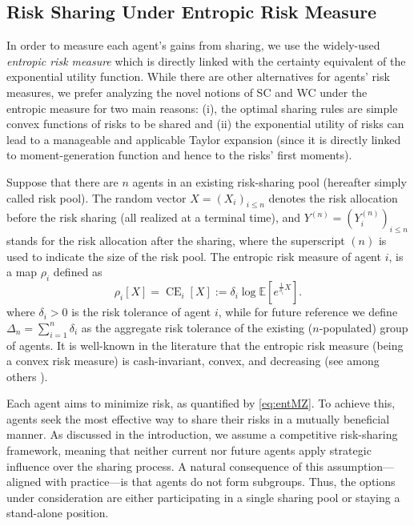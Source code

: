 \documentclass[fleqn,mnsc,nonblindrev]{informs4}
\newcommand{\CE}{\operatorname{CE}}
\begin{document}
\subsection{Risk Sharing Under Entropic Risk Measure } \label{sec:classic}

In order to measure each agent's gains from sharing, we use the widely-used \textit{entropic risk measure} which is directly linked with the certainty equivalent of the exponential utility function. While there are other alternatives for agents' risk measures, we prefer analyzing the  {novel} notions of SC and WC under the entropic measure for two main reasons: (i), the optimal sharing rules are simple convex functions of risks to be shared and (ii) the exponential utility of risks can lead to a manageable and applicable Taylor expansion (since it is directly linked to moment-generation function and hence to the risks' first moments). 

Suppose that there are $n$ agents in an existing risk-sharing pool (hereafter simply called risk pool). The random vector $X=(X_i)_{i\leq n}$ denotes the risk allocation before the risk sharing  {(all realized at a terminal time)}, and $Y^{(n)}=(Y_i^{(n)})_{i\leq n}$ stands for the risk allocation after the sharing, where the superscript $(n)$ is used to indicate the size of the risk pool. The entropic risk measure of agent $i$, is a map  $\rho_i$ defined as 
\begin{equation}\label{eq:entMZ}
\rho_i[X]=\CE_i[X]:=\delta_i\log\mathbb{E}[e^{\frac{1}{\delta_i}X}].
\end{equation}
where $\delta_i>0$ is the risk tolerance of agent $i$, while for future reference we define $\Delta_n=\sum_{i=1}^n\delta_i$ as the aggregate risk tolerance of the existing ($n$-populated) group of agents. It is well-known in the literature that the entropic risk measure (being a convex risk measure) is cash-invariant, convex, and decreasing (see among others \cite{follmer2011entropic}). 

Each agent aims to minimize risk, as quantified by \eqref{eq:entMZ}. To achieve this, agents seek the most effective way to share their risks in a mutually beneficial manner. As discussed in the introduction, we assume a competitive risk-sharing framework, meaning that neither current nor future agents apply strategic influence over the sharing process. A natural consequence of this assumption—aligned with practice—is that agents do not form subgroups. Thus, the options under consideration are either participating in a single sharing pool or staying a stand-alone position.
\end{document}
